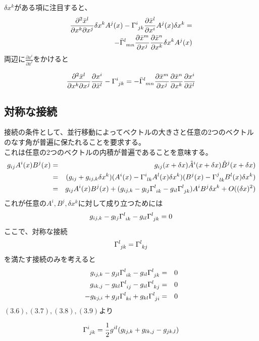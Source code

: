 \documentclass[dvipdfmx]{report} %
\begin{document}
$\delta x^k$がある項に注目すると、
\begin{eqnarray*}
\frac{\partial^2 \bar{x}^l}{\partial x^k \partial x^j} \delta x^k A^j(x) - \tensor{\Gamma}{^i_{jk}} \frac{\partial \bar{x}^l}{\partial x^i}A^j(x) \delta x^k = \\
- \tensor{\bar{\Gamma}}{^l_{mn}} \frac{\partial \bar{x}^m}{\partial x^j} \frac{\partial \bar{x}^n}{\partial x^k}\delta x^k A^j(x)
\end{eqnarray*}
両辺に$\frac{\partial x^i}{\partial \bar{x}^l}$をかけると
\begin{tcolorbox}
\begin{eqnarray*}
\frac{\partial^2 \bar{x}^l}{\partial x^k \partial x^j} \frac{\partial x^i}{\partial \bar{x}^l} - \tensor{\Gamma}{^i_{jk}} = - \tensor{\bar{\Gamma}}{^l_{mn}} \frac{\partial \bar{x}^m}{\partial x^j} \frac{\partial \bar{x}^n}{\partial x^k} \frac{\partial x^i}{\partial \bar{x}^l}
\end{eqnarray*}
\end{tcolorbox}

\subsection{
	対称な接続
}
接続の条件として、並行移動によってベクトルの大きさと任意の2つのベクトルのなす角が普遍に保たれることを要求する。\\
これは任意の2つのベクトルの内積が普遍であることを意味する。\\
\begin{eqnarray*}
g_{ij} A^i(x)B^j(x) &=& g_{ij}(x + \delta x) \tilde{A}^i(x+\delta x) \tilde{B}^j(x+\delta x)\\
&=& (g_{ij} + g_{ij,k}\delta x^k)(A^i(x) - \tensor{\Gamma}{^i_{lk}}A^l(x) \delta x^k) (B^j(x) - \tensor{\Gamma}{^j_{lk}}B^l(x) \delta x^k)\\
&=& g_{ij} A^i(x)B^j(x) + (g_{ij,k} - g_{lj}\tensor{\Gamma}{^l_{ik}} - g_{il}\tensor{\Gamma}{^l_{jk}} )A^i B^j \delta x^k + O((\delta x)^2)
\end{eqnarray*}
これが任意の$A^i, B^j, \delta x^k$に対して成り立つためには
\begin{eqnarray*}
 g_{ij,k} - g_{lj}\tensor{\Gamma}{^l_{ik}} - g_{il}\tensor{\Gamma}{^l_{jk}} = 0
 \end{eqnarray*}
 ここで、対称な接続
\begin{eqnarray}
\tensor{\Gamma}{^l_{jk}} = \tensor{\Gamma}{^l_{kj}}
\end{eqnarray}
 を満たす接続のみを考えると
\begin{eqnarray}
 g_{ij,k} - g_{jl}\tensor{\Gamma}{^l_{ik}} - g_{il}\tensor{\Gamma}{^l_{jk}} &=& 0\\
 g_{ik,j} - g_{kl}\tensor{\Gamma}{^l_{ij}} - g_{il}\tensor{\Gamma}{^l_{kj}} &=& 0\\
 - g_{kj,i} + g_{jl}\tensor{\Gamma}{^l_{ki}} + g_{kl}\tensor{\Gamma}{^l_{ji}} &=& 0
\end{eqnarray}
$(3.6), (3.7), (3.8), (3.9)$より
\begin{tcolorbox}
\begin{eqnarray*}
	\tensor{\Gamma}{^i_{jk}} = \frac{1}{2} g^{il} (g_{lj,k} + g_{lk,j} - g_{jk,l})
\end{eqnarray*}
\end{tcolorbox}
\end{document}
